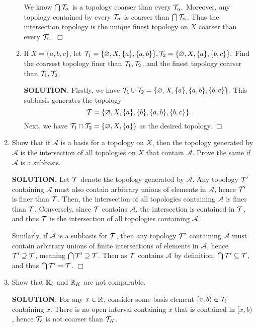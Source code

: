 \documentclass{article}
\begin{document}
\begin{enumerate}
\begin{enumerate}
        We know $\bigcap \mathcal{T}_\alpha$ is a topology coarser than every $\mathcal{T}_\alpha.$ Moreover, any topology contained by every $\mathcal{T}_\alpha$ is coarser than $\bigcap \mathcal{T}_\alpha$. Thus the intersection topology is the unique finest topology on $X$ coarser than every $\mathcal{T}_\alpha$. $\Box$ 
        
        \item If $X =\{a, b, c\}$, let $\mathcal{T}_1 = \{\varnothing, X, \{a\}, \{a, b\}\}, \mathcal{T}_2 = \{\varnothing, X, \{a\}, \{b, c\}\}.$ Find the coarsest topology finer than $\mathcal{T}_1, \mathcal{T}_2$, and the finest topology coarser than $\mathcal{T}_1, \mathcal{T}_2$.

        {\bf SOLUTION.} Firstly, we have $\mathcal{T}_1 \cup \mathcal{T}_2 = \{\varnothing, X, \{a\}, \{a, b\}, \{b, c\}\}$. This subbasis generates the topology
        $$\mathcal{T} = \{\varnothing, X, \{a\}, \{b\}, \{a, b\}, \{b, c\}\}.$$
        Next, we have $\mathcal{T}_1 \cap \mathcal{T}_2 = \{ \varnothing, X, \{a\} \}$ as the desired topology. $\Box$
    \end{enumerate}

    \item Show that if $\mathcal{A}$ is a basis for a topology on $X$, then the topology generated by $\mathcal{A}$ is the intersection of all topologies on $X$ that contain $\mathcal{A}$. Prove the same if $\mathcal{A}$ is a subbasis.

    {\bf SOLUTION.} Let $\mathcal{T}$ denote the topology generated by $\mathcal{A}$. Any topology $\mathcal{T}'$ containing $\mathcal{A}$ must also contain arbitrary unions of elements in $\mathcal{A}$, hence $\mathcal{T}'$ is finer than $\mathcal{T}$. Then, the intersection of all topologies containing $\mathcal{A}$ is finer than $\mathcal{T}$. Conversely, since $\mathcal{T}$ contains $\mathcal{A}$, the intersection is contained in $\mathcal{T}$, and thus $\mathcal{T}$ is the intersection of all topologies containing $\mathcal{A}.$
    
    Similarly, if $\mathcal{A}$ is a subbasis for $\mathcal{T}$, then any topology $\mathcal{T}'$ containing $\mathcal{A}$ must contain arbitrary unions of finite intersections of elements in $\mathcal{A}$, hence $\mathcal{T}' \supseteq \mathcal{T}$, meaning $\bigcap \mathcal{T}' \supseteq \mathcal{T}$. Then as $\mathcal{T}$ contains $\mathcal{A}$ by definition, $\bigcap \mathcal{T}' \subseteq \mathcal{T}$, and thus $\bigcap \mathcal{T}' = \mathcal{T}$. $\Box$

    \item Show that $\mathbb{R}_\ell$ and $\mathbb{R}_K$ are not comparable.

    {\bf SOLUTION.} For any $x \in \mathbb{R}$, consider some basis element $[x, b) \in \mathcal{T}_\ell$ containing $x$. There is no open interval containing $x$ that is contained in $[x, b)$, hence $\mathcal{T}_\ell$ is not coarser than $\mathcal{T}_K$.
    

\end{enumerate}
\end{document}
